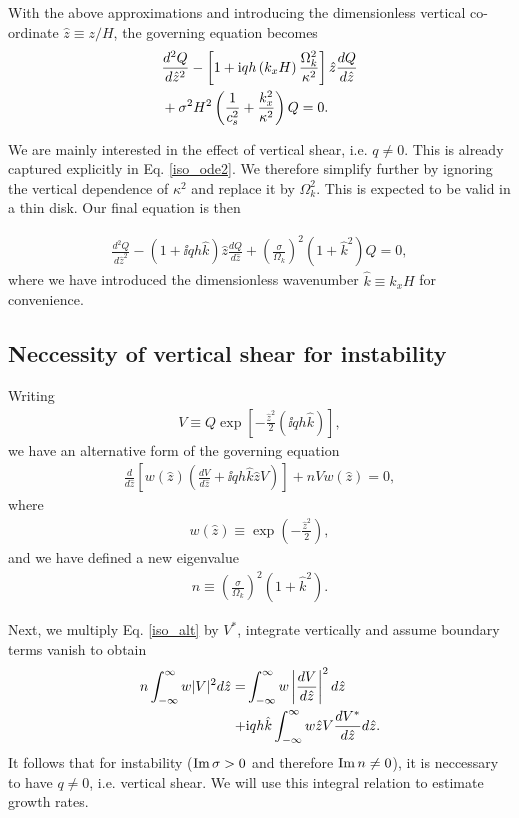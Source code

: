 With the above approximations and introducing the dimensionless
vertical co-ordinate $\hat{z} \equiv z/H$, the governing equation becomes
\begin{align}\label{iso_ode2}
  &\frac{d^2Q}{d\hat{z}^2} - \left[ 1 + \mathrm{i} qh
    \left(k_xH\right)\frac{\Omega_k^2}{\kappa^2}\right]\hat{z}\frac{dQ}{d\hat{z}}\notag\\
  &+ \sigma^2H^2\left(\frac{1}{c_s^2}+\frac{k_x^2}{\kappa^2}\right)Q =
  0. 
\end{align}

We are mainly interested in the effect of vertical shear, i.e. $q\neq
0$. This is already captured explicitly in Eq. \ref{iso_ode2}. We 
therefore simplify further by ignoring the vertical dependence of
$\kappa^2$ and replace it by $\Omega_k^2$. This is expected to be
valid in a thin disk. Our final equation is then

\begin{align}\label{iso_ode3}
  \frac{d^2Q}{d\hat{z}^2} - \left(1 + \ii qh
    \hat{k}\right)\hat{z}\frac{dQ}{d\hat{z}} +
  \left(\frac{\sigma}{\Omega_k}\right)^2\left(1+\hat{k}^2\right)Q = 
  0, 
\end{align}
where we have introduced the dimensionless wavenumber $\hat{k}
\equiv k_x H$ for convenience. 

\subsection{Neccessity of vertical shear for instability}
Writing
\begin{align}
  V \equiv Q\exp{\left[-\frac{\hat{z}^2}{2}(\ii q h
      \hat{k})\right]},
\end{align}
we have an alternative form of the governing equation 
\begin{align}\label{iso_alt}
  \frac{d}{d\hat{z}}\left[w(\hat{z})\left(\frac{dV}{d\hat{z}} + \ii q h
    \hat{k}\hat{z}V\right)\right] + nV w(\hat{z}) =0, 
\end{align}
where 
\begin{align}
  w(\hat{z}) \equiv \exp{\left(-\frac{\hat{z}^2}{2}\right)},  
\end{align}
and we have defined a new eigenvalue
\begin{align}
  n \equiv \left(\frac{\sigma}{\Omega_k}\right)^2(1+\hat{k}^2). 
\end{align}

Next, we multiply Eq. \ref{iso_alt} by $V^{*}$, integrate
vertically and assume boundary terms vanish to obtain
\begin{align}\label{integral_relation}
  n \int_{-\infty}^{\infty}w|V|^2d\hat{z} 
  =&\int_{-\infty}^{\infty}w\left|\frac{dV}{d\hat{z}}\right|^2d\hat{z}\notag\\
  +&\mathrm{i} q h \hat{k}\int_{-\infty}^{\infty}w\hat{z}V\frac{dV^*}{d\hat{z}}d\hat{z}.   
\end{align}
It follows that for instability ($\operatorname{Im}\sigma>0$ and therefore $\operatorname{Im}
n \neq 0$), it is neccessary to have $q\neq 0$, i.e. vertical
shear. We will use this integral relation to estimate growth
rates. 

